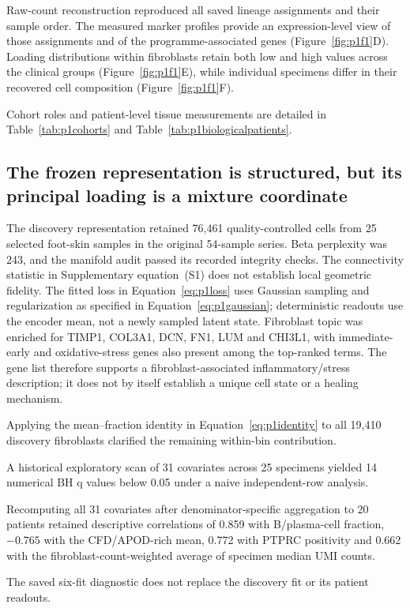 \documentclass[10pt,a4paper]{article}
\begin{document}
Raw-count reconstruction reproduced all saved lineage assignments and their sample order. The measured marker profiles provide an expression-level view of those assignments and of the programme-associated genes (Figure~\ref{fig:p1f1}D). Loading distributions within fibroblasts retain both low and high values across the clinical groups (Figure~\ref{fig:p1f1}E), while individual specimens differ in their recovered cell composition (Figure~\ref{fig:p1f1}F).

Cohort roles and patient-level tissue measurements are detailed in Table~\ref{tab:p1cohorts} and Table~\ref{tab:p1biologicalpatients}.

\subsection{The frozen representation is structured, but its principal loading is a mixture coordinate}
The discovery representation retained 76,461 quality-controlled cells from 25 selected foot-skin samples in the original 54-sample series. Beta perplexity was 243, and the manifold audit passed its recorded integrity checks. The connectivity statistic in Supplementary equation~(S1) does not establish local geometric fidelity. The fitted loss in Equation~\eqref{eq:p1loss} uses Gaussian sampling and regularization as specified in Equation~\eqref{eq:p1gaussian}; deterministic readouts use the encoder mean, not a newly sampled latent state. Fibroblast topic was enriched for TIMP1, COL3A1, DCN, FN1, LUM and CHI3L1, with immediate-early and oxidative-stress genes also present among the top-ranked terms. The gene list therefore supports a fibroblast-associated inflammatory/stress description; it does not by itself establish a unique cell state or a healing mechanism.

Applying the mean--fraction identity in Equation~\eqref{eq:p1identity} to all 19,410 discovery fibroblasts clarified the remaining within-bin contribution.

A historical exploratory scan of 31 covariates across 25 specimens yielded 14 numerical BH q values below 0.05 under a naive independent-row analysis.

Recomputing all 31 covariates after denominator-specific aggregation to 20 patients retained descriptive correlations of 0.859 with B/plasma-cell fraction, $-0.765$ with the CFD/APOD-rich mean, 0.772 with PTPRC positivity and 0.662 with the fibroblast-count-weighted average of specimen median UMI counts.

The saved six-fit diagnostic does not replace the discovery fit or its patient readouts.
\end{document}
